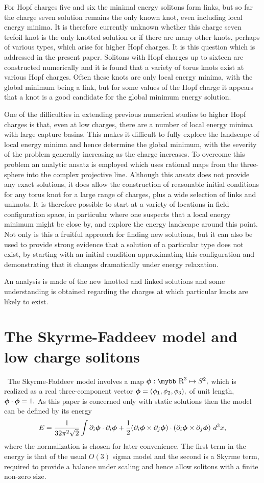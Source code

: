 \documentclass[12pt]{article}
\newcommand{\be}{\begin{equation}}
\newcommand{\ee}{\end{equation}}
\newcommand{\bphi}{\mbox{\boldmath $\phi$}}
\def\bb#1{\hbox{\mybb#1}}
\newcommand{\news}{\setcounter{equation}{0}}
\begin{document}
For Hopf charges five and six the minimal energy solitons form
links, but so far the charge seven solution remains the only known
knot, even including local energy minima. It is therefore currently
unknown whether this charge seven trefoil knot is the only knotted
solution or if there are many other knots, perhaps of various types,
which arise for higher Hopf charges. It is this question which is
addressed in the present paper. Solitons with Hopf charges up to
sixteen are constructed numerically and it is found that a variety
of torus knots exist at various Hopf charges. Often these knots are
only local energy minima, with the global minimum being a link, but
for some values of the Hopf charge it appears that a knot is a good
candidate for the global minimum energy solution.

One of the difficulties in extending previous numerical studies to
higher Hopf charges is that, even at low charges, there are a number
of local energy minima with large capture basins. This makes it
difficult to fully explore the landscape of local energy minima and
hence determine the global minimum, with the severity of the
problem generally increasing as the charge increases. To overcome
this problem an analytic ansatz is employed which uses rational maps
from the three-sphere into the complex projective line. Although
this ansatz does not provide any exact solutions, it does allow the
construction of reasonable initial conditions for any torus knot for
a large range of charges, plus a wide selection of links and
unknots. It is therefore possible to start at a variety of locations
in field configuration space, in particular where one suspects that
a local energy minimum might be close by, and explore the energy
landscape around this point. Not only is this a fruitful approach
for finding new solutions, but it can also be used to provide strong
evidence that a solution of a particular type does not exist, by
starting with an initial condition approximating this configuration
and demonstrating that it changes dramatically under energy
relaxation.

An analysis is made of the new knotted and linked solutions and some
understanding is obtained regarding the charges at which particular
knots are likely to exist.

\section{The Skyrme-Faddeev model and low charge solitons}\news
\ \quad The Skyrme-Faddeev model involves a map $\bphi:
\bb{R}^3\mapsto S^2,$ which is realized as a real three-component
vector $\bphi=(\phi_1,\phi_2,\phi_3),$ of unit length,
$\bphi\cdot\bphi=1.$ As this paper is concerned only with static
solutions then the model can be defined by its energy \be
E=\frac{1}{32\pi^2\sqrt{2}}\int \partial_i\bphi\cdot\partial_i\bphi
+\frac{1}{2}(\partial_i\bphi\times\partial_j\bphi)
\cdot(\partial_i\bphi\times\partial_j\bphi)\ d^3x, \label{energy}
\ee where the normalization is chosen for later convenience. The
first term in the energy is that of the usual $O(3)$ sigma model and
the second is a Skyrme term, required to provide a balance under
scaling and hence allow solitons with a finite non-zero size.
\end{document}
